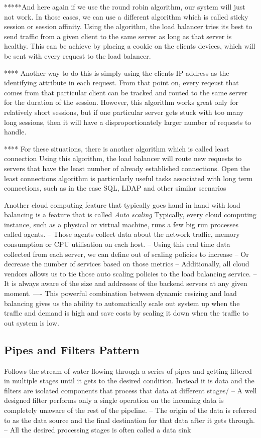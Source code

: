 \documentclass[a4paper, 11pt]{book}
\begin{document}
    *****And here again if we use the round robin algorithm, our system will just not work.
    In those cases, we can use a different algorithm which is called sticky session or session affinity.
    Using the algorithm, the load balancer tries its best to send traffic from a given client to the same server as long as that server is healthy.
    This can be achieve by placing a cookie on the clients devices, which will be sent with every request to the load balancer.

    **** Another way to do this is simply using the clients IP address as the identifying attribute in each request.
    From that point on, every reqeust that comes from that particular client can be tracked and routed to the same server for the duration of the session.
    However, this algorithm works great only for relatively short sessions, but if one particular server gets stuck with too many long sessions, then it will have a disproportionately larger number of requests to handle.

    **** For these situations, there is another algorithm which is called least connection
    Using this algorithm, the load balancer will route new requests to servers that have the least number of already established connections.
    Open the least connections algorithm is particularly useful tasks associated with long term connections, such as in the case SQL, LDAP and other similar scenarios

    Another cloud computing feature that typically goes hand in hand with load balancing is a feature that is called \textit{Auto scaling}
    Typically, every cloud computing instance, such as a physical or virtual machine, runs a few big run processes called agents.
    -- Those agents collect data about the network traffic, memory consumption or CPU utilisation on each host.
    -- Using this real time data collected from each server, we can define out of scaling policies to increase
    -- Or decrease the number of services based on those metrics
    -- Additionally, all cloud vendors allows us to tie those auto scaling policies to the load balancing service.
    -- It is always aware of the size and addresses of the backend servers at any given moment.
    ---- This powerful combination between dynamic resizing and load balancing gives us the ability to automatically scale out system up when the traffic and demand is high and save costs by scaling it down when the traffic to out system is low.

    \subsection{Pipes and Filters Pattern}
    Follows the stream of water flowing through a series of pipes and getting filtered in multiple stages until it gets to the desired condition.
    Instead it is data and the filters are isolated components that process that data at different stages/
    -- A well designed filter performs only a single operation on the incoming data is completely unaware of the rest of the pipeline.
    -- The origin of the data is referred to as the data source and the final destination for that data after it gets through.
    -- All the desired processing stages is often called a data sink
\end{document}
